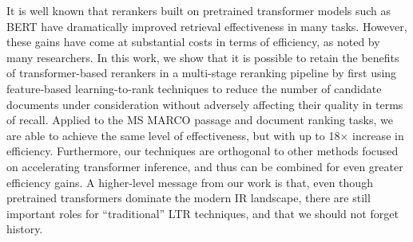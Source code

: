 It is well known that rerankers built on pretrained transformer models such as BERT have dramatically improved retrieval effectiveness in many tasks. However, these gains have come at substantial costs in terms of efficiency, as noted by many researchers. In this work, we show that it is possible to retain the benefits of transformer-based rerankers in a multi-stage reranking pipeline by first using feature-based learning-to-rank techniques to reduce the number of candidate documents under consideration without adversely affecting their quality in terms of recall. Applied to the MS MARCO passage and document ranking tasks, we are able to achieve the same level of effectiveness, but with up to 18× increase in efficiency. Furthermore, our techniques are orthogonal to other methods focused on accelerating transformer inference, and thus can be combined for even greater efficiency gains. A higher-level message from our work is that, even though pretrained transformers dominate the modern IR landscape, there are still important roles for ``traditional'' LTR techniques, and that we should not forget history.
